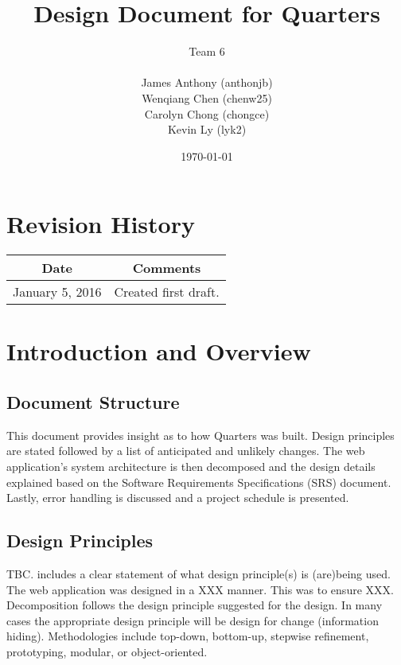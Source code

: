 \documentclass[12pt]{article}
\begin{document}
\title{Design Document for Quarters} 
\author{Team 6\\ \\James Anthony (anthonjb)\\ Wenqiang Chen (chenw25)\\ Carolyn Chong 
(chongce)\\ Kevin Ly (lyk2)}
\date{\today}
  
\maketitle

\pagebreak

\tableofcontents

\section*{Revision History}
\begin{tabular}{|c|c|}
\hline
\textbf{Date}  & \textbf{Comments} \\ \hline
January 5, 2016 & Created first draft. \\ 
\hline
\end{tabular}

\pagebreak


\section{Introduction and Overview}

\subsection{Document Structure}
This document provides insight as to how Quarters was built. Design principles are stated followed by a list of anticipated and unlikely changes. The web application's system architecture is then decomposed and the design details explained based on the Software Requirements Specifications (SRS) document. Lastly, error handling is discussed and a project schedule is presented. 

\subsection{Design Principles}
TBC. includes a clear statement of what design principle(s) is (are)being used. The web application was designed in a XXX manner. This was to ensure XXX. Decomposition follows the design principle suggested for the design. In many cases the appropriate design principle will be design for change (information hiding). Methodologies include top-down, bottom-up, stepwise refinement, prototyping, modular, or object-oriented.
\end{document}
